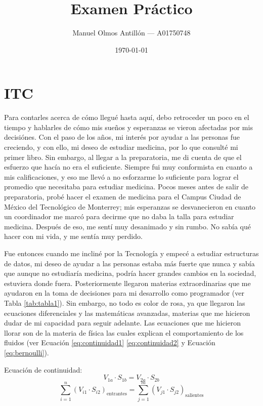 \documentclass{article}
\title{\textbf{Examen Práctico}}
\author[1]{Manuel Olmos Antillón --- A01750748}
\affil[1]{Ingeniería en Sistemas Computacionales 5° semestre, Escuela de Ingeniería y Ciencias, Tecnológico de Monterrey}
\date{\today}
\begin{document}
\maketitle
\tableofcontents

\section{ITC}
\indent \indent Para contarles acerca de cómo llegué hasta aquí, debo retroceder un poco en el tiempo y hablarles de cómo mis sueños y esperanzas se vieron afectadas por mis decisiónes.
Con el paso de los años, mi interés por ayudar a las personas fue creciendo, y con ello, mi deseo de estudiar medicina, por lo que consulté mi primer libro\cite{alvarez2020}. Sin embargo, al llegar a la preparatoria, me di cuenta de que el esfuerzo que hacía no era el suficiente.
Siempre fui muy conformista en cuanto a mis calificaciones, y eso me llevó a no esforzarme lo suficiente para lograr el promedio que necesitaba para estudiar medicina. 
Pocos meses antes de salir de preparatoria, probé hacer el examen de medicina para el Campus Ciudad de México del Tecnológico de Monterrey; mis esperanzas se desvanecieron en cuanto un coordinador me marcó para decirme que no daba la talla para estudiar medicina.
Después de eso, me sentí muy desanimado y sin rumbo. No sabía qué hacer con mi vida, y me sentía muy perdido.

\indent Fue entonces cuando me incliné por la Tecnología y empecé a estudiar estructuras de datos\cite{stephens2013essential}, mi deseo de ayudar a las personas estaba más fuerte que nunca y sabía que aunque no estudiaría medicina, podría hacer grandes cambios en la sociedad, estuviera donde fuera.
Posteriormente llegaron materias extraordinarias que me ayudaron en la toma de decisiones para mi desarrollo como programador (ver Tabla \ref{tab:tabla1}). %
Sin embargo, no todo es color de rosa, ya que llegaron las ecuaciones diferenciales y las matemáticas avanzadas, materias que me hicieron dudar de mi capacidad para seguir adelante. Las ecuaciones que me hicieron llorar son de la materia de física las cuales explican el comportamiento de los fluidos (ver Ecuación \ref{eq:continuidad1} \ref{eq:continuidad2} y Ecuación \ref{eq:bernoulli}). %

\indent Ecuación de continuidad:
\begin{equation}
    V_{1a} \cdot S_{1b} = V_{2a} \cdot S_{2b}
    \label{eq:continuidad1}
\end{equation}
\begin{equation}
    \sum_{i=1}^n {(V_{i1} \cdot S_{i2})}_{\mathrm{entrantes}} = \sum_{j=1}^m {(V_{j1} \cdot S_{j2})}_{\mathrm{salientes}}
    \label{eq:continuidad2}
\end{equation}
\end{document}
